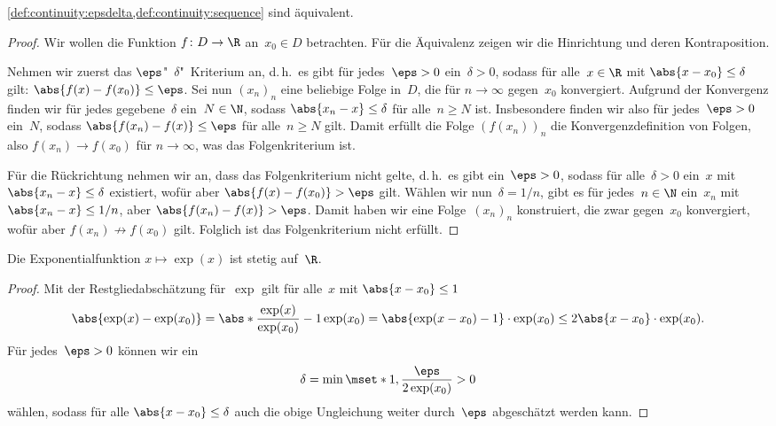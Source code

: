 \documentclass[a4paper]{article}
\begin{document}
\begin{theorem}
    \cref{def:continuity:epsdelta,def:continuity:sequence} sind äquivalent.
\end{theorem}

\begin{proof}
    Wir wollen die Funktion $f\colon D \to \R$ an~$x_0 \in D$ betrachten. Für die Äquivalenz zeigen wir die Hinrichtung und deren Kontraposition.
    
    Nehmen wir zuerst das $\eps$"~$\delta$"~Kriterium an, d.\,h.\ es gibt für jedes~$\eps > 0$ ein~$\delta > 0$, sodass für alle~$x \in \R$ mit $\abs{x-x_0} \leq \delta$ gilt: $\abs{f(x)-f(x_0)} \leq \eps$. Sei nun $(x_n)_n$ eine beliebige Folge in~$D$, die für $n \to \infty$ gegen~$x_0$ konvergiert. Aufgrund der Konvergenz finden wir für jedes gegebene~$\delta$ ein~$N \in \N$, sodass $\abs{x_n-x} \leq \delta$ für alle~$n \geq N$ ist. Insbesondere finden wir also für jedes~$\eps > 0$ ein~$N$, sodass $\abs{f(x_n)-f(x)} \leq \eps$ für alle~$n \geq N$ gilt. Damit erfüllt die Folge $(f(x_n))_n$ die Konvergenzdefinition von Folgen, also $f(x_n) \to f(x_0)$ für $n \to \infty$, was das Folgenkriterium ist.

    Für die Rückrichtung nehmen wir an, dass das Folgenkriterium nicht gelte, d.\,h.\ es gibt ein~$\eps > 0$, sodass für alle~$\delta > 0$ ein~$x$ mit $\abs{x_n-x} \leq \delta$ existiert, wofür aber $\abs{f(x)-f(x_0)} > \eps$ gilt. Wählen wir nun~$\delta = 1/n$, gibt es für jedes~$n \in \N$ ein~$x_n$ mit $\abs{x_n-x} \leq 1/n$, aber $\abs{f(x_n)-f(x)} > \eps$. Damit haben wir eine Folge~$(x_n)_n$ konstruiert, die zwar gegen~$x_0$ konvergiert, wofür aber $f(x_n) \not\to f(x_0)$ gilt. Folglich ist das Folgenkriterium nicht erfüllt.
\end{proof}

\begin{proposition}
    Die Exponentialfunktion $x \mapsto \exp(x)$ ist stetig auf~$\R$.
\end{proposition}

\begin{proof}
    Mit der Restgliedabschätzung für~$\exp$ gilt für alle~$x$ mit $\abs{x-x_0} \leq 1$
    \begin{equation*}
        \abs{\exp(x)-\exp(x_0)} = \abs*{\frac{\exp(x)}{\exp(x_0)} - 1} \exp(x_0) = \abs{\exp(x-x_0)-1} \cdot \exp(x_0) \leq  2\abs{x-x_0} \cdot \exp(x_0).
    \end{equation*}
    Für jedes~$\eps > 0$ können wir ein
    \begin{equation*}
        \delta = \min\mset*{1, \frac{\eps}{2\exp(x_0)}} > 0
    \end{equation*}
    wählen, sodass für alle $\abs{x-x_0} \leq \delta$ auch die obige Ungleichung weiter durch~$\eps$ abgeschätzt werden kann.
\end{proof}
\end{document}
